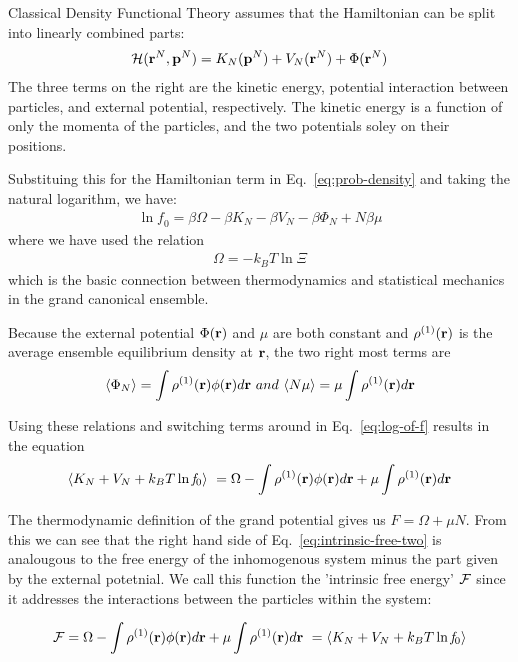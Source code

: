 Classical Density Functional Theory assumes that the Hamiltonian can
be split into linearly combined parts:
\begin{align}\label{eq:hamiltonian}
  \mathcal{H}(\textbf{r}^N,\mathbf{p}^N) = K_N(\mathbf{p}^N) + V_N(\textbf{r}^N) + \Phi(\textbf{r}^N)
\end{align}
The three terms on the right are the kinetic energy, potential
interaction between particles, and external potential, respectively.
The kinetic energy is a function of only the momenta of the particles,
and the two potentials soley on their positions.

Substituing this for the Hamiltonian term in Eq.~\ref{eq:prob-density}
and taking the natural logarithm, we have:
\begin{align}
  \label{log-of-f}
  \ln \mathit{f}_0 = \beta\Omega - \beta K_N - \beta V_N - \beta \Phi_N + N\beta \mu
\end{align}
where we have used the relation
\begin{align}
  \Omega = -k_BT\ln\Xi
\end{align}
which is the basic connection between thermodynamics and statistical
mechanics in the grand canonical ensemble.

Because the external potential $\Phi(\textbf{r})$ and $\mu$ are both constant
and $\rho^{(1)}(\textbf{r})$ is the average ensemble equilibrium density at
$\textbf{r}$, the two right most terms are
\begin{align}
  \langle \Phi_N \rangle = \int \rho^{(1)}(\textbf{r})\phi(\textbf{r})d\textbf{r} \
  and \
  \langle N\mu \rangle = \mu \int \rho^{(1)}(\textbf{r}) d\textbf{r}
\end{align}

Using these relations and switching terms around in
Eq.~\ref{eq:log-of-f} results in the equation
\begin{align} \label{eq:intrinsic-free-two}
  \langle K_N + V_N + k_BT \ln \mathit{f}_0 \rangle \
  = \Omega - \int \rho^{(1)}(\textbf{r})\phi(\textbf{r})d\textbf{r} + \mu \int \rho^{(1)}(\textbf{r})d\textbf{r}
\end{align}

The thermodynamic definition of the grand potential gives us $F =
\Omega + \mu N$.  From this we can see that the right hand side of
Eq.~\ref{eq:intrinsic-free-two} is analougous to the free energy of
the inhomogenous system minus the part given by the external
potetnial.  We call this function the 'intrinsic free energy' $\mathcal{F}$
since it addresses the interactions between the particles within the
system:

\begin{align}
  \mathcal{F} = \Omega - \int \rho^{(1)}(\textbf{r})\phi(\textbf{r})d\textbf{r} + \mu \int \rho^{(1)}(\textbf{r})d\textbf{r} \
  = \langle K_N + V_N + k_BT \ln \mathit{f}_0 \rangle
\end{align}

